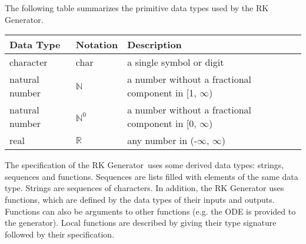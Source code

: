 \documentclass[12pt, titlepage]{article}
\newcommand{\progname}{the RK Generator\xspace}
\begin{document}
The following table summarizes the primitive data types used by \progname. 

\begin{center}
  \renewcommand{\arraystretch}{1.2}
  \noindent 
  \begin{tabular}{l l p{7.5cm}} 
    \toprule 
    \textbf{Data Type} & \textbf{Notation} & \textbf{Description}\\ 
    \midrule
    character & char & a single symbol or digit\\
    natural number & $\mathbb{N}$ & a number without a fractional component in 
    [1, $\infty$) \\
    natural number & $\mathbb{N}^0$ & a number without a fractional component 
    in 
    [0, $\infty$) \\
    real & $\mathbb{R}$ & any number in (-$\infty$, $\infty$)\\
    \bottomrule
  \end{tabular} 
\end{center}

\noindent
The specification of \progname \ uses some derived data types: strings, 
sequences and functions. 
Sequences are lists filled with elements of the same data type.
Strings are sequences of characters. 
In addition, \progname uses functions, which are defined by the data types of 
their inputs and outputs. Functions can also be arguments to other functions 
(e.g. the ODE is provided to the generator). 
Local functions are described by giving their type signature followed by their 
specification.
\end{document}

